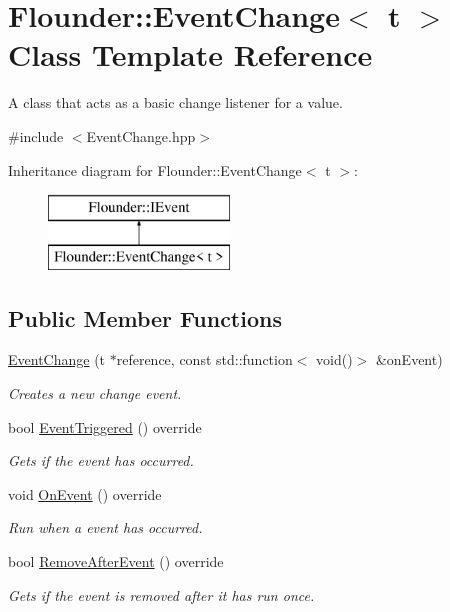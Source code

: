 \hypertarget{class_flounder_1_1_event_change}{}\section{Flounder\+:\+:Event\+Change$<$ t $>$ Class Template Reference}
\label{class_flounder_1_1_event_change}


A class that acts as a basic change listener for a value.  




{\ttfamily \#include $<$Event\+Change.\+hpp$>$}

Inheritance diagram for Flounder\+:\+:Event\+Change$<$ t $>$\+:\begin{figure}[H]
\begin{center}
\leavevmode
\includegraphics[height=2.000000cm]{class_flounder_1_1_event_change}
\end{center}
\end{figure}
\subsection*{Public Member Functions}
\begin{DoxyCompactItemize}
\item 
\hyperlink{class_flounder_1_1_event_change_adf5f452e97195baf2e4d4bfd3b5f6fd3}{Event\+Change} (t $\ast$reference, const std\+::function$<$ void()$>$ \&on\+Event)
\begin{DoxyCompactList}\small\item\em Creates a new change event. \end{DoxyCompactList}\item 
bool \hyperlink{class_flounder_1_1_event_change_a1c6e0cafceb20ee7e6197e570abf17d8}{Event\+Triggered} () override
\begin{DoxyCompactList}\small\item\em Gets if the event has occurred. \end{DoxyCompactList}\item 
void \hyperlink{class_flounder_1_1_event_change_a07f5769fc3e4c401e1f3929978f759fc}{On\+Event} () override
\begin{DoxyCompactList}\small\item\em Run when a event has occurred. \end{DoxyCompactList}\item 
bool \hyperlink{class_flounder_1_1_event_change_ad13467a09f7a46260b52fae6bba11973}{Remove\+After\+Event} () override
\begin{DoxyCompactList}\small\item\em Gets if the event is removed after it has run once. \end{DoxyCompactList}\end{DoxyCompactItemize}
